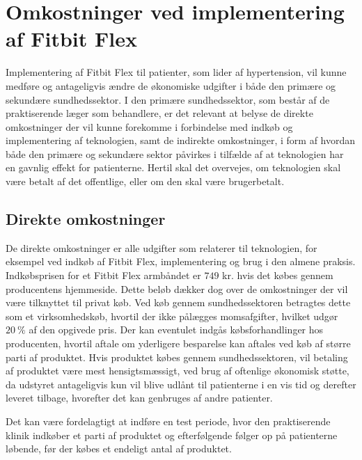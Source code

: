
\section{Omkostninger ved implementering af Fitbit Flex} \label{sec:armbaand_omkost}


Implementering af Fitbit Flex til patienter, som lider af hypertension, vil kunne medføre og antageligvis ændre de økonomiske udgifter i både den primære og sekundære sundhedssektor. I den primære sundhedssektor, som består af de praktiserende læger som behandlere, er det relevant at belyse de direkte omkostninger der vil kunne forekomme i forbindelse med indkøb og implementering af teknologien, samt de indirekte omkostninger, i form af hvordan både den primære og sekundære sektor påvirkes i tilfælde af at teknologien har en gavnlig effekt for patienterne. Hertil skal det overvejes, om teknologien skal være betalt af det offentlige, eller om den skal være brugerbetalt. 

\subsection{Direkte omkostninger} \label{sec:dir_omkost}
De direkte omkostninger er alle  udgifter som relaterer til teknologien, for eksempel ved indkøb af Fitbit Flex, implementering og brug i den almene praksis.  
Indkøbsprisen for et Fitbit Flex armbåndet er $749$ kr. hvis det købes gennem producentens hjemmeside. Dette beløb dækker dog over de omkostninger der vil være tilknyttet til privat køb. 
Ved køb gennem sundhedssektoren betragtes dette som et virksomhedskøb, hvortil der ikke pålægges momsafgifter, hvilket udgør $20~\%$ af den opgivede pris. 
Der kan eventulet indgås købsforhandlinger hos producenten, hvortil aftale om yderligere besparelse kan aftales ved køb af større parti af produktet. Hvis produktet købes gennem sundhedssektoren, vil betaling af produktet være mest hensigtsmæssigt, ved brug af oftenlige økonomisk støtte, da udstyret antageligvis kun vil blive udlånt til patienterne i en vis tid og derefter leveret tilbage, hvorefter det kan genbruges af andre patienter. 

Det kan være fordelagtigt at indføre en test periode, hvor den praktiserende klinik indkøber et parti af produktet og efterfølgende følger op på patienterne løbende, før der købes et endeligt antal af produktet. 
                 

